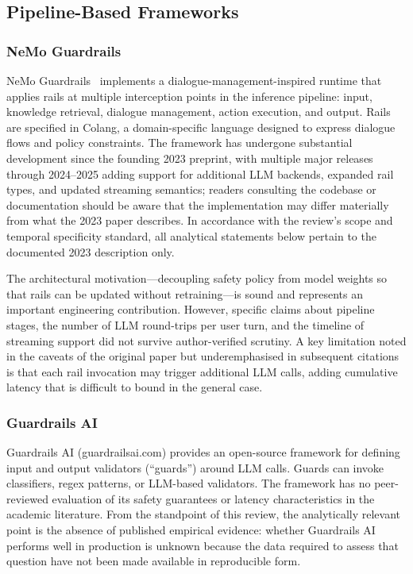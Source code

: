 \subsection{Pipeline-Based Frameworks}

\subsubsection{NeMo Guardrails}

NeMo Guardrails~\cite{rebedea2023nemo} implements a dialogue-management-inspired
runtime that applies rails at multiple interception points in the inference pipeline:
input, knowledge retrieval, dialogue management, action execution, and output.
Rails are specified in Colang, a domain-specific language designed to express
dialogue flows and policy constraints.
The framework has undergone substantial development since the founding 2023 preprint,
with multiple major releases through 2024--2025 adding support for additional LLM
backends, expanded rail types, and updated streaming semantics; readers consulting
the codebase or documentation should be aware that the implementation may differ
materially from what the 2023 paper describes.
In accordance with the review's scope and temporal specificity standard, all
analytical statements below pertain to the documented 2023 description only.

The architectural motivation---decoupling safety policy from model weights so that
rails can be updated without retraining---is sound and represents an important
engineering contribution.
However, specific claims about pipeline stages, the number of LLM round-trips
per user turn, and the timeline of streaming support did not survive author-verified
scrutiny.
A key limitation noted in the caveats of the original paper but underemphasised
in subsequent citations is that each rail invocation may trigger additional LLM
calls, adding cumulative latency that is difficult to bound in the general case.

\subsubsection{Guardrails AI}

Guardrails AI (guardrailsai.com) provides an open-source framework for defining
input and output validators (``guards'') around LLM calls.
Guards can invoke classifiers, regex patterns, or LLM-based validators.
The framework has no peer-reviewed evaluation of its safety guarantees or latency
characteristics in the academic literature.
From the standpoint of this review, the analytically relevant point is the absence
of published empirical evidence: whether Guardrails AI performs well in production
is unknown because the data required to assess that question have not been made
available in reproducible form.

